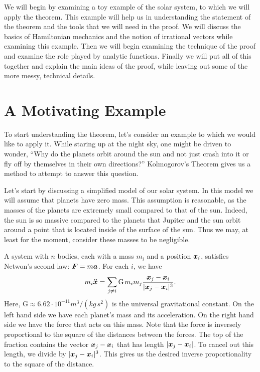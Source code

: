 \documentclass[twoside,letterpaper,11pt]{article}
\numberwithin{equation}{section}
\begin{document}
We will begin by examining a toy example of the solar system, to which we will
apply the theorem.
This example will help us in understanding the statement of the theorem and the
tools that we will need in the proof.
We will discuss the basics of Hamiltonian mechanics and the notion of irrational
vectors while examining this example.
Then we will begin examining the technique of the proof and examine the role
played by analytic functions.
Finally we will put all of this together and explain the main ideas of the
proof, while leaving out some of the more messy, technical details.

\section{A Motivating Example}
\label{sec:motivating-example}

To start understanding the theorem, let's consider an example to which we would
like to apply it.
While staring up at the night sky, one might be driven to wonder, ``Why do the
planets orbit around the sun and not just crash into it or fly off by themselves
in their own directions?''
Kolmogorov's Theorem gives us a method to attempt to answer this question.

Let's start by discussing a simplified model of our solar system.
In this model we will assume that planets have zero mass.
This assumption is reasonable, as the masses of the planets are extremely small
compared to that of the sun.
Indeed, the sun is so massive compared to the planets that Jupiter and the sun
orbit around a point that is located inside of the surface of the sun.
Thus we may, at least for the moment, consider these masses to be negligible.

A system with $n$ bodies, each with a mass $m_i$ and a position $\bm{x}_i$,
satisfies Netwon's second law: $\bm{F} = m \bm{a}$.
For each $i$, we have
\begin{equation*}
  m_i \bdd{x} = \sum_{j \neq i} \mathrm{G} \nobreak\hspace{.125em plus
    .14286em} m_i m_j \frac{\bp{x}_j - \bp{x}_i}{|\bp{x}_j - \bp{x}_i|^3}.
\end{equation*}
Here, $\mathrm{G} \approx 6.62 \cdot 10^{-11} m^3 / (kg\, s^2)$ is the universal
gravitational constant.
On the left hand side we have each planet's mass and its acceleration.
On the right hand side we have the force that acts on this mass.
Note that the force is inversely proportional to the square of the distances
between the forces.
The top of the fraction contains the vector $\bm{x}_j - \bm{x}_i$ that has
length $|\bm{x}_j - \bm{x}_i|$.
To cancel out this length, we divide by $|\bm{x}_j - \bm{x}_i|^3$.
This gives us the desired inverse proportionality to the square of the distance.
\end{document}
